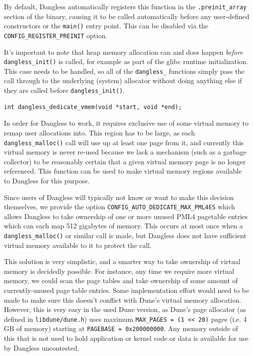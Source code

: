 By default, Dangless automatically registers this function in the \lstinline!.preinit_array! section of the binary, causing it to be called automatically before any user-defined constructors or the \lstinline!main()! entry point. This can be disabled via the \lstinline!CONFIG_REGISTER_PREINIT! option.

It's important to note that heap memory allocation can and does happen \emph{before} \lstinline!dangless_init()! is called, for example as part of the glibc runtime initialization. This case needs to be handled, so all of the \lstinline!dangless_! functions simply pass the call through to the underlying (system) allocator without doing anything else if they are called before \lstinline!dangless_init()!.

\begin{lstlisting}
int dangless_dedicate_vmem(void *start, void *end);
\end{lstlisting}

In order for Dangless to work, it requires exclusive use of some virtual memory to remap user allocations into. This region has to be large, as each \lstinline!dangless_malloc()! call will use up at least one page from it, and currently this virtual memory is never re-used because we lack a mechanism (such as a garbage collector) to be reasonably certain that a given virtual memory page is no longer referenced. This function can be used to make virtual memory regions available to Dangless for this purpose.

Since users of Dangless will typically not know or want to make this decision themselves, we provide the option \lstinline!CONFIG_AUTO_DEDICATE_MAX_PML4ES! which allows Dangless to take ownership of one or more unused PML4 pagetable entries which can each map 512 gigabytes of memory. This occurs at most once when a \lstinline!dangless_malloc()! or similar call is made, but Dangless does not have sufficient virtual memory available to it to protect the call.

This solution is very simplistic, and a smarter way to take ownership of virtual memory is decidedly possible. For instance, any time we require more virtual memory, we could scan the page tables and take ownership of some amount of currently-unused page table entries. Some implementation effort would need to be made to make sure this doesn't conflict with Dune's virtual memory allocation. However, this is very easy in the used Dune version, as Dune's page allocator (as defined in \texttt{libdune/dune.h}) uses maximum \lstinline!MAX_PAGES = (1 << 20)! pages (i.e. 4 GB of memory) starting at \lstinline!PAGEBASE = 0x200000000!. Any memory outside of this that is not used to hold application or kernel code or data is available for use by Dangless uncontested.

